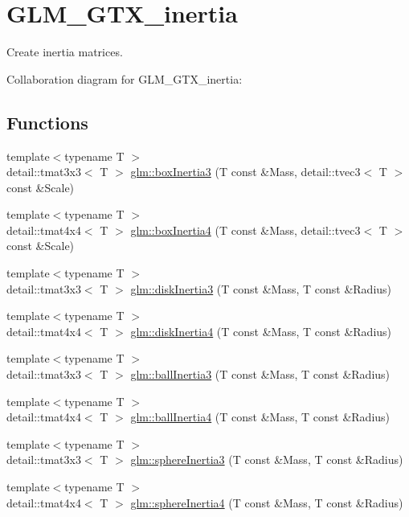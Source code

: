 \hypertarget{group__gtx__inertia}{}\section{G\+L\+M\+\_\+\+G\+T\+X\+\_\+inertia}
\label{group__gtx__inertia}


Create inertia matrices.  


Collaboration diagram for G\+L\+M\+\_\+\+G\+T\+X\+\_\+inertia\+:
\subsection*{Functions}
\begin{DoxyCompactItemize}
\item 
{\footnotesize template$<$typename T $>$ }\\detail\+::tmat3x3$<$ T $>$ \hyperlink{group__gtx__inertia_gafc837a32c6bd921748c4fc7ec7dda7e1}{glm\+::box\+Inertia3} (T const \&Mass, detail\+::tvec3$<$ T $>$ const \&Scale)
\item 
{\footnotesize template$<$typename T $>$ }\\detail\+::tmat4x4$<$ T $>$ \hyperlink{group__gtx__inertia_gaaa39a53ec43b9c6d046b3407104990f1}{glm\+::box\+Inertia4} (T const \&Mass, detail\+::tvec3$<$ T $>$ const \&Scale)
\item 
{\footnotesize template$<$typename T $>$ }\\detail\+::tmat3x3$<$ T $>$ \hyperlink{group__gtx__inertia_gae71f78e2dc40f7d6ffdb088549287370}{glm\+::disk\+Inertia3} (T const \&Mass, T const \&Radius)
\item 
{\footnotesize template$<$typename T $>$ }\\detail\+::tmat4x4$<$ T $>$ \hyperlink{group__gtx__inertia_ga1f205ea0c47195a156234ca9dda8ff33}{glm\+::disk\+Inertia4} (T const \&Mass, T const \&Radius)
\item 
{\footnotesize template$<$typename T $>$ }\\detail\+::tmat3x3$<$ T $>$ \hyperlink{group__gtx__inertia_gadce989778e572b2cdca8879f6d546c58}{glm\+::ball\+Inertia3} (T const \&Mass, T const \&Radius)
\item 
{\footnotesize template$<$typename T $>$ }\\detail\+::tmat4x4$<$ T $>$ \hyperlink{group__gtx__inertia_ga6493a41b36da51c3122f61f68f44a96f}{glm\+::ball\+Inertia4} (T const \&Mass, T const \&Radius)
\item 
{\footnotesize template$<$typename T $>$ }\\detail\+::tmat3x3$<$ T $>$ \hyperlink{group__gtx__inertia_ga43e1260e6fb0bf29558091cd9447a6ca}{glm\+::sphere\+Inertia3} (T const \&Mass, T const \&Radius)
\item 
{\footnotesize template$<$typename T $>$ }\\detail\+::tmat4x4$<$ T $>$ \hyperlink{group__gtx__inertia_ga6a8eefbd055ddea7522316677a78f649}{glm\+::sphere\+Inertia4} (T const \&Mass, T const \&Radius)
\end{DoxyCompactItemize}


